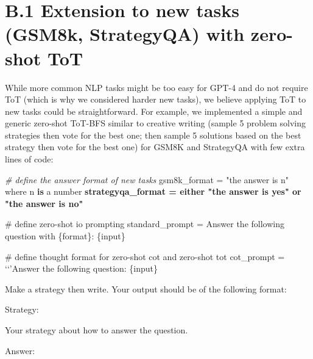 \documentclass[
]{article}
\newenvironment{Shaded}{}{}
\newcommand{\CommentTok}[1]{\textcolor[rgb]{0.38,0.63,0.69}{\textit{#1}}}
\newcommand{\ErrorTok}[1]{\textcolor[rgb]{1.00,0.00,0.00}{\textbf{#1}}}
\newcommand{\KeywordTok}[1]{\textcolor[rgb]{0.00,0.44,0.13}{\textbf{#1}}}
\newcommand{\NormalTok}[1]{#1}
\newcommand{\OperatorTok}[1]{\textcolor[rgb]{0.40,0.40,0.40}{#1}}
\newcommand{\StringTok}[1]{\textcolor[rgb]{0.25,0.44,0.63}{#1}}
\begin{document}
\section{B.1 Extension to new tasks (GSM8k, StrategyQA) with zero-shot
ToT}\label{b.1-extension-to-new-tasks-gsm8k-strategyqa-with-zero-shot-tot}

While more common NLP tasks might be too easy for GPT-4 and do not
require ToT (which is why we considered harder new tasks), we believe
applying ToT to new tasks could be straightforward. For example, we
implemented a simple and generic zero-shot ToT-BFS similar to creative
writing (sample 5 problem solving strategies then vote for the best one;
then sample 5 solutions based on the best strategy then vote for the
best one) for GSM8K and StrategyQA with few extra lines of code:

\begin{Shaded}
\begin{Highlighting}[]
\CommentTok{\# define the answer format of new tasks}
\NormalTok{gsm8k\_format }\OperatorTok{=} \StringTok{"the answer is n"}\NormalTok{ where n }\KeywordTok{is}\NormalTok{ a number}\StringTok{\textquotesingle{}}
\ErrorTok{strategyqa\_format = \textquotesingle{}either "the answer is yes" or "the answer is no"\textquotesingle{} }
\end{Highlighting}
\end{Shaded}

\begin{Shaded}
\begin{Highlighting}[]
\NormalTok{\# define zero{-}shot io prompting}
\NormalTok{standard\_prompt = \textquotesingle{}Answer the following question with \{format\}: \{input\}\textquotesingle{} }
\end{Highlighting}
\end{Shaded}

\begin{Shaded}
\begin{Highlighting}[]
\NormalTok{\# define thought format for zero{-}shot cot and zero{-}shot tot cot\_prompt = ‘‘’Answer the following question: \{input\} }
\end{Highlighting}
\end{Shaded}

Make a strategy then write. Your output should be of the following
format:

Strategy:

Your strategy about how to answer the question.

Answer:
\end{document}
